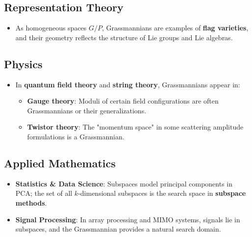 \documentclass{amsart}
\theoremstyle{plain}
\theoremstyle{definition}
\theoremstyle{remark}
\begin{document}
\subsection{\textbf{Representation Theory}}

\begin{itemize}
	\item As homogeneous spaces $G/P$, Grassmannians are examples of \textbf{flag varieties}, and their geometry reflects the structure of Lie groups and Lie algebras.
\end{itemize}

\subsection{\textbf{Physics}}

\begin{itemize}
	\item In \textbf{quantum field theory} and \textbf{string theory}, Grassmannians appear in:
	\begin{itemize}
		\item \textbf{Gauge theory}: Moduli of certain field configurations are often Grassmannians or their generalizations.
		\item \textbf{Twistor theory}: The "momentum space" in some scattering amplitude formulations is a Grassmannian.
	\end{itemize}
\end{itemize}

\subsection{\textbf{Applied Mathematics}}

\begin{itemize}
	\item \textbf{Statistics \& Data Science}: Subspaces model principal components in PCA; the set of all $k$-dimensional subspaces is the search space in \textbf{subspace methods}.
	\item \textbf{Signal Processing}: In array processing and MIMO systems, signals lie in subspaces, and the Grassmannian provides a natural search domain.
\end{itemize}
\end{document}
